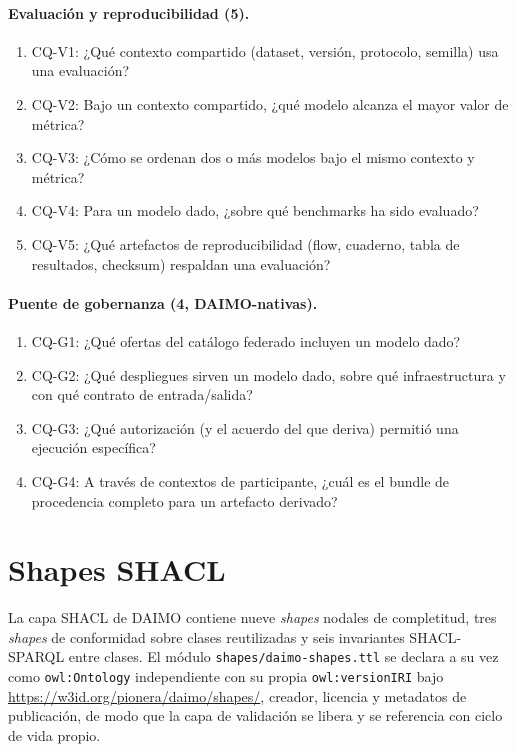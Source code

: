 \documentclass[11pt,a4paper]{article}
\newcommand{\code}[1]{\texttt{#1}}
\newcommand{\cq}[1]{\textsf{#1}}
\begin{document}
\paragraph{Evaluación y reproducibilidad (5).}
\begin{enumerate}[label=\arabic*., leftmargin=*]
\item \cq{CQ-V1}: ¿Qué contexto compartido (dataset, versión, protocolo, semilla) usa una evaluación?
\item \cq{CQ-V2}: Bajo un contexto compartido, ¿qué modelo alcanza el mayor valor de métrica?
\item \cq{CQ-V3}: ¿Cómo se ordenan dos o más modelos bajo el mismo contexto y métrica?
\item \cq{CQ-V4}: Para un modelo dado, ¿sobre qué benchmarks ha sido evaluado?
\item \cq{CQ-V5}: ¿Qué artefactos de reproducibilidad (flow, cuaderno, tabla de resultados, checksum) respaldan una evaluación?
\end{enumerate}

\paragraph{Puente de gobernanza (4, DAIMO-nativas).}
\begin{enumerate}[label=\arabic*., leftmargin=*]
\item \cq{CQ-G1}: ¿Qué ofertas del catálogo federado incluyen un modelo dado?
\item \cq{CQ-G2}: ¿Qué despliegues sirven un modelo dado, sobre qué infraestructura y con qué contrato de entrada/salida?
\item \cq{CQ-G3}: ¿Qué autorización (y el acuerdo del que deriva) permitió una ejecución específica?
\item \cq{CQ-G4}: A través de contextos de participante, ¿cuál es el bundle de procedencia completo para un artefacto derivado?
\end{enumerate}

\section{Shapes SHACL}\label{app:shapes}

La capa SHACL de DAIMO contiene nueve \emph{shapes} nodales de completitud, tres \emph{shapes} de conformidad sobre clases reutilizadas y seis invariantes SHACL-SPARQL entre clases. El módulo \code{shapes/daimo-shapes.ttl} se declara a su vez como \code{owl:Ontology} independiente con su propia \code{owl:versionIRI} bajo \url{https://w3id.org/pionera/daimo/shapes/}, creador, licencia y metadatos de publicación, de modo que la capa de validación se libera y se referencia con ciclo de vida propio.
\end{document}

